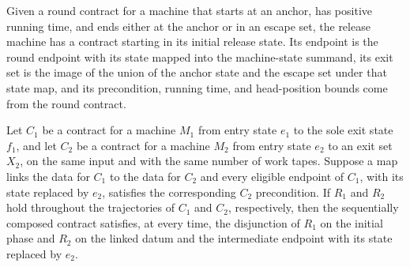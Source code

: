 \begin{definition}
\label{Turing.RoundContract.release}
\leanok
{}
Given a round contract for a machine that starts at an anchor, has positive running
time, and ends either at the anchor or in an escape set, the release machine has a
contract starting in its initial release state. Its endpoint is the round endpoint with
its state mapped into the machine-state summand, its exit set is the image of the union
of the anchor state and the escape set under that state map, and its precondition,
running time, and head-position bounds come from the round contract.
\end{definition}

\begin{theorem}
\label{Turing.Contract.Traj.seq}
\leanok
{}
Let $C_1$ be a contract for a machine $M_1$ from entry state $e_1$ to the sole exit
state $f_1$, and let $C_2$ be a contract for a machine $M_2$ from entry state $e_2$ to
an exit set $X_2$, on the same input and with the same number of work tapes. Suppose a
map links the data for $C_1$ to the data for $C_2$ and every eligible endpoint of $C_1$,
with its state replaced by $e_2$, satisfies the corresponding $C_2$ precondition. If
$R_1$ and $R_2$ hold throughout the trajectories of $C_1$ and $C_2$, respectively, then
the sequentially composed contract satisfies, at every time, the disjunction of $R_1$ on
the initial phase and $R_2$ on the linked datum and the intermediate endpoint with its
state replaced by $e_2$.
\end{theorem}

